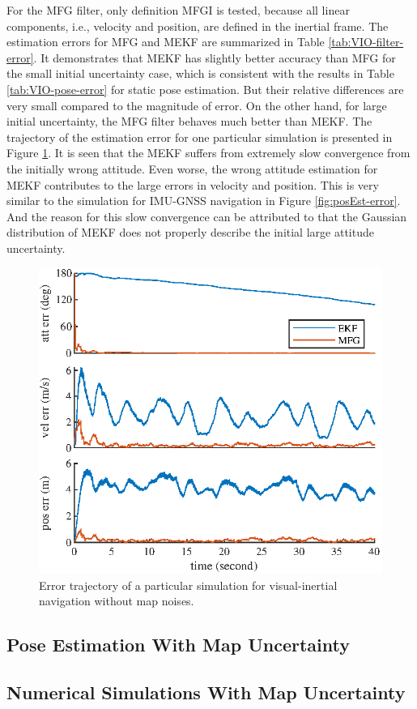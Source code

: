 For the MFG filter, only definition MFGI is tested, because all linear components, i.e., velocity and position, are defined in the inertial frame.
The estimation errors for MFG and MEKF are summarized in Table \ref{tab:VIO-filter-error}.
It demonstrates that MEKF has slightly better accuracy than MFG for the small initial uncertainty case, which is consistent with the results in Table \eqref{tab:VIO-pose-error} for static pose estimation.
But their relative differences are very small compared to the magnitude of error.
On the other hand, for large initial uncertainty, the MFG filter behaves much better than MEKF.
The trajectory of the estimation error for one particular simulation is presented in Figure \ref{fig:VIO-filter-error}.
It is seen that the MEKF suffers from extremely slow convergence from the initially wrong attitude.
Even worse, the wrong attitude estimation for MEKF contributes to the large errors in velocity and position.
This is very similar to the simulation for IMU-GNSS navigation in Figure \ref{fig:posEst-error}.
And the reason for this slow convergence can be attributed to that the Gaussian distribution of MEKF does not properly describe the initial large attitude uncertainty.

\begin{figure}
	\centering
	\includegraphics[scale=1.3]{figures/VIO-filter-error}
	\caption{Error trajectory of a particular simulation for visual-inertial navigation without map noises.}
	\label{fig:VIO-filter-error}
\end{figure}

\subsection{Pose Estimation With Map Uncertainty}

\subsection{Numerical Simulations With Map Uncertainty}

